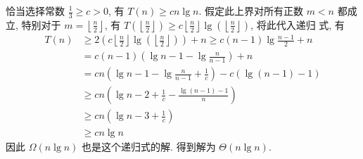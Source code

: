 \documentclass[boxes]{homework}
\begin{document}
\begin{solution}
    恰当选择常数 $ \frac{ 1 }{ 3 } \geqslant c > 0$, 有
    $T(n) \geqslant cn\lg n$. 假定此上界对所有正数 $m < n$ 都成立, 特别对于
    $m = \left\lfloor \frac{n}{2} \right\rfloor$, 有
    $T \left( \left\lfloor \frac{ n }{ 2 } \right\rfloor\right) \geqslant
        c\left\lfloor \frac{ n }{ 2 } \right\rfloor \lg
        \left( \left\lfloor \frac{ n }{ 2 } \right\rfloor\right)$, 将此代入递归
    式, 有
    \begin{equation}
        \begin{aligned}
            T(n)
             & \geqslant 2 \left(
            c \left\lfloor \frac{ n }{ 2 } \right\rfloor \lg
            \left( \left\lfloor \frac{ n }{ 2 } \right\rfloor\right)
            \right) + n
            \geqslant c (n - 1) \lg \frac{ n - 1 }{ 2 } + n           \\
             & = c (n - 1)
            \left( \lg n - 1 - \lg \frac{ n }{ n - 1 }\right) + n     \\
             & = cn
            \left( \lg n - 1 - \lg \frac{ n }{ n - 1 } + \frac{ 1 }{ c }\right)
            - c \left( \lg \left( n - 1\right) - 1\right)             \\
             & \geqslant cn \left( \lg n - 2 + \frac{ 1 }{ c } -
            \frac{ \lg (n - 1) - 1 }{ n } \right)                     \\
             & \geqslant cn \left( \lg n - 3 + \frac{ 1 }{ c }\right) \\
             & \geqslant cn\lg n
        \end{aligned}
    \end{equation}
    因此 $\Omega (n\lg n)$ 也是这个递归式的解. 得到解为 $\Theta(n \lg n)$.

\end{solution}
\end{document}
